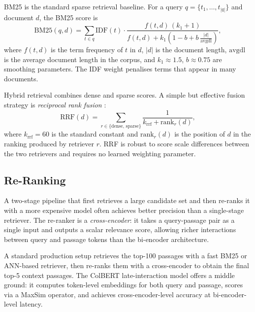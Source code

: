 \begin{context}
BM25 \citep{robertson2009probabilistic} is the standard sparse retrieval baseline.
For a query $q = \{t_1, \ldots, t_{|q|}\}$ and document $d$, the BM25 score is
\begin{equation}
  \text{BM25}(q, d) = \sum_{t \in q} \text{IDF}(t) \cdot
  \frac{f(t, d)\,(k_1 + 1)}{f(t, d) + k_1\!\left(1 - b + b\,\frac{|d|}{\text{avgdl}}\right)},
  \label{eq:bm25}
\end{equation}
where $f(t, d)$ is the term frequency of $t$ in $d$, $|d|$ is the document length,
$\text{avgdl}$ is the average document length in the corpus, and $k_1 \approx 1.5$,
$b \approx 0.75$ are smoothing parameters.  The IDF weight penalises terms that
appear in many documents.

Hybrid retrieval combines dense and sparse scores.  A simple but effective fusion
strategy is \emph{reciprocal rank fusion} \citep{cormack2009reciprocal}:
\begin{equation}
  \text{RRF}(d) = \sum_{r \in \{\text{dense},\,\text{sparse}\}}
    \frac{1}{k_{\text{rrf}} + \text{rank}_r(d)},
  \label{eq:rrf}
\end{equation}
where $k_{\text{rrf}} = 60$ is the standard constant and $\text{rank}_r(d)$ is the
position of $d$ in the ranking produced by retriever $r$.  RRF is robust to score
scale differences between the two retrievers and requires no learned weighting parameter.

\subsection{Re-Ranking}
\label{sec:rag-reranking}

A two-stage pipeline that first retrieves a large candidate set and then re-ranks it
with a more expensive model often achieves better precision than a single-stage
retriever.  The re-ranker is a \emph{cross-encoder}: it takes a query-passage pair
as a single input and outputs a scalar relevance score, allowing richer interactions
between query and passage tokens than the bi-encoder architecture.

A standard production setup retrieves the top-100 passages with a fast BM25 or
ANN-based retriever, then re-ranks them with a cross-encoder to obtain the final top-5
context passages.  The ColBERT \citep{khattab2020colbert} late-interaction model
offers a middle ground: it computes token-level embeddings for both query and passage,
scores via a MaxSim operator, and achieves cross-encoder-level accuracy at
bi-encoder-level latency.


\end{context}
